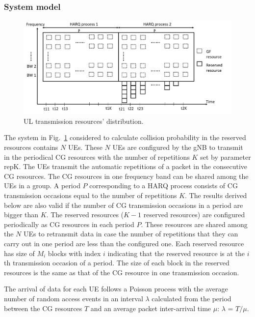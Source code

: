 \documentclass{ieeeaccess}
\begin{document}
\subsubsection{System model} \label{IIIB2}

\begin{figure}[htbp]
\centerline{\includegraphics[scale=0.25]{fig6.png}}
\caption{UL transmission resources' distribution.}
\label{fig6}
\vspace{-2mm}
\end{figure}

The system in Fig.~\ref{fig6} considered to calculate collision probability in the reserved resources contains $N$ UEs. These $N$ UEs are configured by the gNB to transmit in the periodical CG resources with the number of repetitions $K$ set by parameter repK. The UEs transmit the automatic repetitions of a packet in the consecutive CG resources. The CG resources in one frequency band can be shared among the UEs in a group. A period $P$ corresponding to a HARQ process consists of CG transmission occasions equal to the number of repetitions $K$. The results derived below are also valid if the number of CG transmission occasions in a period are bigger than $K$. The reserved resources ($K-1$ reserved resources) are configured periodically as CG resources in each period $P$. These resources are shared among the $N$ UEs to retransmit data in case the number of repetitions that they can carry out in one period are less than the configured one. Each reserved resource has size of $M_{i}$ blocks with index $i$ indicating that the reserved resource is at the $i$th transmission occasion of a period. The size of each block in the reserved resources is the same as that of the CG resource in one transmission occasion.

The arrival of data for each UE follows a Poisson process with the average number of random access events in an interval $\lambda$ calculated from the period between the CG resources $T$ and an average packet inter-arrival time $\mu$: $\lambda$ = $T/\mu$.
\end{document}
